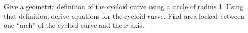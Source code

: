Give a geometric definition of the cycloid curve using a circle of radius 1. Using that definition, derive equations for the cycloid curve. Find area locked between one ``arch'' of the cycloid curve and the $x$ axis.


